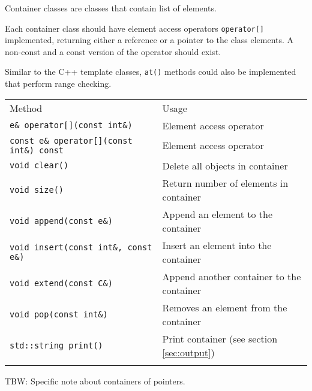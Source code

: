 \documentclass{article}[12pt,a4]
\begin{document}
Container classes are classes that contain list of elements.

Each container class should have element access operators {\tt operator[]} implemented,
returning either a reference or a pointer to the class elements.
A non-const and a const version of the operator should exist.

Similar to the C++ template classes, {\tt at()} methods could also be implemented that
perform range checking.

\begin{center}
\begin{tabular}{ll}
\hline
\hline
\noalign{\smallskip}
Method & Usage \\
\noalign{\smallskip}
\hline
\noalign{\smallskip}
{\tt e\& operator[](const int\&)} & Element access operator \\
{\tt const e\& operator[](const int\&) const} & Element access operator \\
{\tt void clear()} & Delete all objects in container \\
{\tt void size()} & Return number of elements in container \\
{\tt void append(const e\&)} & Append an element to the container \\
{\tt void insert(const int\&, const e\&)} & Insert an element into the container \\
{\tt void extend(const C\&)} & Append another container to the container \\
{\tt void pop(const int\&)} & Removes an element from the container \\
{\tt std::string print()} & Print container (see section \ref{sec:output}) \\
\noalign{\smallskip}
\hline
\end{tabular}
\end{center}

TBW: Specific note about containers of pointers.
\end{document}
